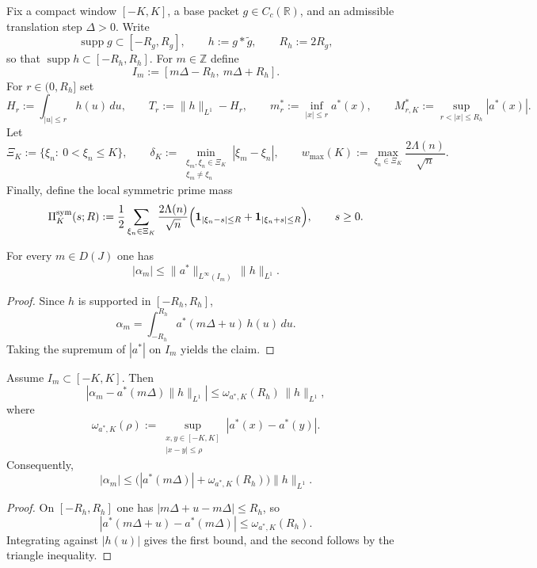 \begin{definition}\label{def:packet-bound-geometry}
Fix a compact window $[-K,K]$, a base packet $g\in C_c(\mathbb R)$, and an
admissible translation step $\Delta>0$. Write
\[
  \operatorname{supp} g\subset[-R_g,R_g],
  \qquad
  h:=g*\widetilde g,
  \qquad
  R_h:=2R_g,
\]
so that $\operatorname{supp} h\subset[-R_h,R_h]$. For $m\in\mathbb Z$ define
\[
  I_m:=[m\Delta-R_h,\ m\Delta+R_h].
\]
For $r\in(0,R_h]$ set
\[
  H_r:=\int_{|u|\le r} h(u)\,du,
  \qquad
  T_r:=\|h\|_{L^1}-H_r,
  \qquad
  m_r^*:=\inf_{|x|\le r} a^*(x),
  \qquad
  M_{r,K}^*:=\sup_{r<|x|\le R_h}|a^*(x)|.
\]
Let
\[
  \Xi_K:=\{\xi_n:\ 0<\xi_n\le K\},
  \qquad
  \delta_K:=\min_{\substack{\xi_m,\xi_n\in\Xi_K\\ \xi_m\neq \xi_n}}
  |\xi_m-\xi_n|,
  \qquad
  w_{\max}(K):=\max_{\xi_n\in\Xi_K}\frac{2\Lambda(n)}{\sqrt n}.
\]
Finally, define the local symmetric prime mass
\[
  \Pi_K^{\mathrm{sym}}(s;R)
  :=
  \frac12\sum_{\xi_n\in\Xi_K}\frac{2\Lambda(n)}{\sqrt n}
  \Bigl(
    \mathbf 1_{|\xi_n-s|\le R}
    +
    \mathbf 1_{|\xi_n+s|\le R}
  \Bigr),
  \qquad s\ge0.
\]
\end{definition}

\begin{lemma}\label{lem:packet-alpha-support-bound}
For every $m\in D(J)$ one has
\[
  |\alpha_m|
  \le
  \|a^*\|_{L^\infty(I_m)}\,\|h\|_{L^1}.
\]
\end{lemma}

\begin{proof}
Since $h$ is supported in $[-R_h,R_h]$,
\[
  \alpha_m
  =
  \int_{-R_h}^{R_h} a^*(m\Delta+u)\,h(u)\,du.
\]
Taking the supremum of $|a^*|$ on $I_m$ yields the claim.
\end{proof}

\begin{lemma}\label{lem:packet-alpha-modulus-bound}
Assume $I_m\subset[-K,K]$. Then
\[
  |\alpha_m-a^*(m\Delta)\|h\|_{L^1}|
  \le
  \omega_{a^*,K}(R_h)\,\|h\|_{L^1},
\]
where
\[
  \omega_{a^*,K}(\rho)
  :=
  \sup_{\substack{x,y\in[-K,K]\\ |x-y|\le\rho}}
  |a^*(x)-a^*(y)|.
\]
Consequently,
\[
  |\alpha_m|
  \le
  \bigl(|a^*(m\Delta)|+\omega_{a^*,K}(R_h)\bigr)\|h\|_{L^1}.
\]
\end{lemma}

\begin{proof}
On $[-R_h,R_h]$ one has $|m\Delta+u-m\Delta|\le R_h$, so
\[
  |a^*(m\Delta+u)-a^*(m\Delta)|\le \omega_{a^*,K}(R_h).
\]
Integrating against $|h(u)|$ gives the first bound, and the second follows by
the triangle inequality.
\end{proof}

